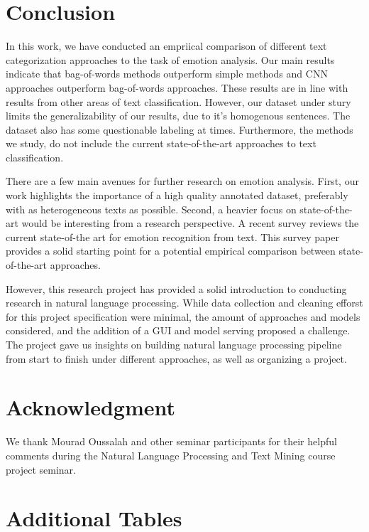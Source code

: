 \documentclass[conference]{IEEEtran}
\begin{document}
\section{Conclusion}

In this work, we have conducted an empriical comparison of different text categorization approaches to the task of emotion analysis. Our main results indicate that bag-of-words methods outperform simple methods and CNN approaches outperform bag-of-words approaches. These results are in line with results from other areas of text classification. However, our dataset under stury limits the generalizability of our results, due to it's homogenous sentences. The dataset also has some questionable labeling at times. Furthermore, the methods we study, do not include the current state-of-the-art approaches to text classification.

There are a few main avenues for further research on emotion analysis. First, our work highlights the importance of a high quality annotated dataset, preferably with as heterogeneous texts as possible. Second, a heavier focus on state-of-the-art would be interesting from a research perspective. A recent survey \cite{alswaidan2020survey} reviews the current state-of-the art for emotion recognition from text. This survey paper provides a solid starting point for a potential empirical comparison between state-of-the-art approaches.

However, this research project has provided a solid introduction to conducting research in natural language processing. While data collection and cleaning efforst for this project specification were minimal, the amount of approaches and models considered, and the addition of a GUI and model serving proposed a challenge. The project gave us insights on building natural language processing pipeline from start to finish under different approaches, as well as organizing a project.

\section*{Acknowledgment}

We thank Mourad Oussalah and other seminar participants for their helpful comments during
 the Natural Language Processing and Text Mining course project seminar.




\appendices
\section{Additional Tables}
\label{FirstAppendix}
\end{document}
